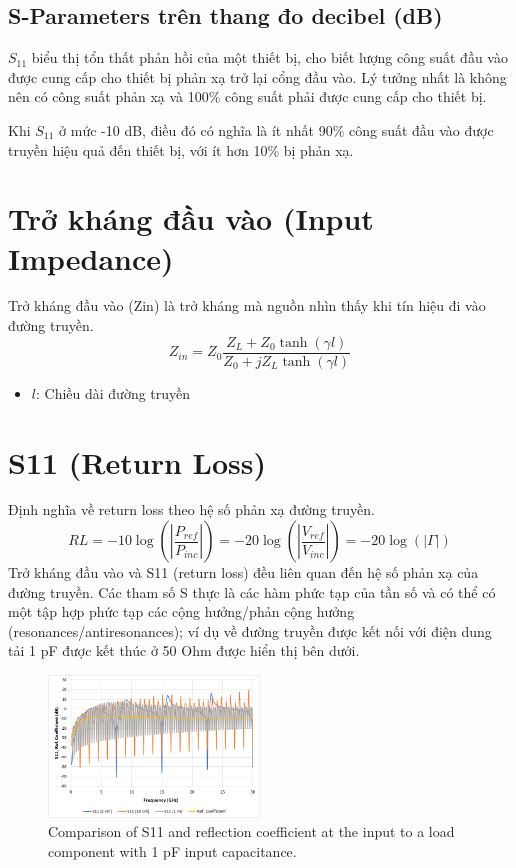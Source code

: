         \subsection{S-Parameters trên thang đo decibel (dB)}
            $S_{11}$ biểu thị tổn thất phản hồi của một thiết bị, 
            cho biết lượng công suất đầu vào được cung cấp cho thiết bị 
            phản xạ trở lại cổng đầu vào. 
            Lý tưởng nhất là không nên có công suất phản xạ và 
            100\% công suất phải được cung cấp cho thiết bị.\par

            Khi $S_{11}$ ở mức -10 dB, điều đó có nghĩa là ít nhất 90\% 
            công suất đầu vào được truyền hiệu quả đến thiết bị, 
            với ít hơn 10\% bị phản xạ.

    \section{Trở kháng đầu vào (Input Impedance)}
        Trở kháng đầu vào (Zin) là trở kháng mà nguồn nhìn thấy khi tín hiệu đi vào đường truyền.
        \begin{equation}
            Z_{in} = Z_0 \frac{Z_L + Z_0 \tanh(\gamma l)}{Z_0 + jZ_L \tanh(\gamma l)}
            \label{eq:zin}    
        \end{equation}
        
        \begin{itemize}
            \item $l$: Chiều dài đường truyền
        \end{itemize}

    \section{S11 (Return Loss)}
        Định nghĩa về return loss theo hệ số phản xạ đường truyền.
        $$RL = -10\log\left(\left|\frac{P_{ref}}{P_{inc}}\right|\right) = -20\log\left(\left|\frac{V_{ref}}{V_{inc}}\right|\right) = -20\log\left(\left|\Gamma\right|\right)$$
        Trở kháng đầu vào và S11 (return loss) đều liên quan đến hệ số phản xạ của đường truyền. Các tham số S thực là các hàm phức tạp của tần số và có thể có một tập hợp phức tạp các cộng hưởng/phản cộng hưởng (resonances/antiresonances); ví dụ về đường truyền được kết nối với điện dung tải 1 pF được kết thúc ở 50 Ohm được hiển thị bên dưới.\par
        \begin{figure}[h]
            \centering
            \includegraphics[width=0.5\textwidth]{figures/1pf_input.png}
            \caption{Comparison of S11 and reflection coefficient at the input to a load component with 1 pF input capacitance.}
        \end{figure}

